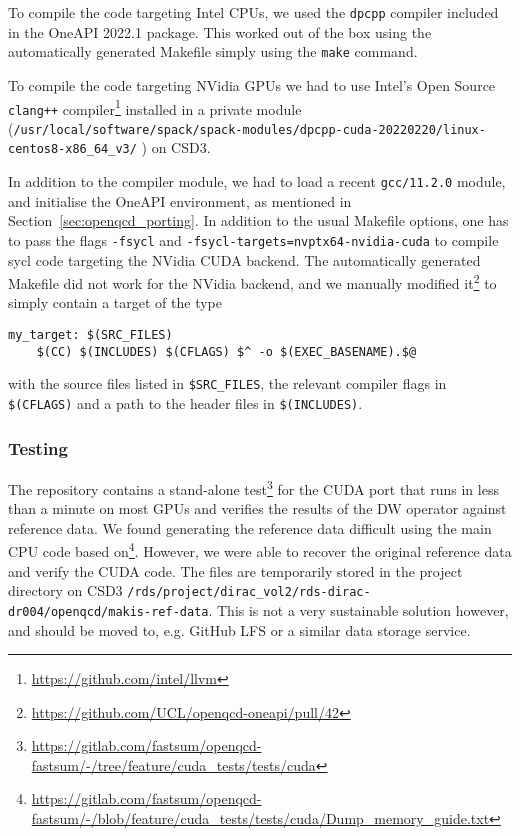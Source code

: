 \documentclass[../main]{subfiles}
\begin{document}
To compile the code targeting Intel CPUs, we used the \texttt{dpcpp} compiler included in the OneAPI 2022.1 package.
This worked out of the box using the automatically generated Makefile simply using the \texttt{make} command.

To compile the code targeting NVidia GPUs we had to use Intel's Open Source \verb #clang++# compiler\footnote{\url{https://github.com/intel/llvm}} installed in a private module (\verb #/usr/local/software/spack/spack-modules/dpcpp-cuda-20220220/linux-centos8-x86_64_v3/# ) on CSD3.

In addition to the compiler module, we had to load a recent \verb #gcc/11.2.0# module, and initialise the OneAPI environment, as mentioned in Section~\ref{sec:openqcd_porting}.
In addition to the usual Makefile options, one has to pass the flags \verb #-fsycl# and \verb #-fsycl-targets=nvptx64-nvidia-cuda# to compile sycl code targeting the NVidia CUDA backend.
The automatically generated Makefile did not work for the NVidia backend, and we manually modified it\footnote{\url{https://github.com/UCL/openqcd-oneapi/pull/42}} to simply contain a target of the type
\begin{verbatim}
my_target: $(SRC_FILES)
	$(CC) $(INCLUDES) $(CFLAGS) $^ -o $(EXEC_BASENAME).$@
\end{verbatim}
with the source files listed in \verb #$SRC_FILES#, the relevant compiler flags in \verb #$(CFLAGS)# and a path to the header files in \verb #$(INCLUDES)#.


\subsubsection{Testing}\label{testing_openqcd}

The repository contains a stand-alone test\footnote{\url{https://gitlab.com/fastsum/openqcd-fastsum/-/tree/feature/cuda_tests/tests/cuda}} for the CUDA port that runs in less than a minute on most GPUs and verifies the results of the DW operator against reference data.
We found generating the reference data difficult using the main CPU code based on\footnote{\url{https://gitlab.com/fastsum/openqcd-fastsum/-/blob/feature/cuda_tests/tests/cuda/Dump\_memory\_guide.txt}}.
However, we were able to recover the original reference data and verify the CUDA code.
The files are temporarily stored in the project directory on CSD3 \texttt{/rds/project/dirac\_vol2/rds-dirac-dr004/openqcd/makis-ref-data}.
This is not a very sustainable solution however, and should be moved to, e.g. GitHub LFS or a similar data storage service.
\end{document}
